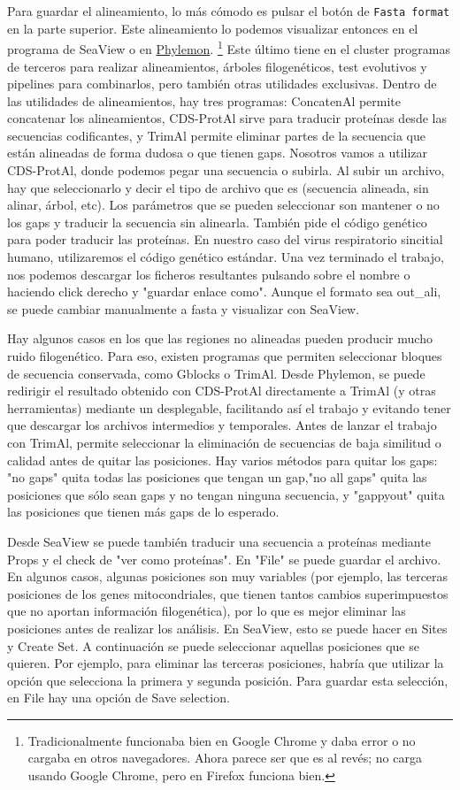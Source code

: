 Para guardar el alineamiento, lo más cómodo es pulsar el botón de \texttt{Fasta format} en la parte superior. Este alineamiento lo podemos visualizar entonces en el programa de SeaView o en \href{http://phylemon.bioinfo.cipf.es/}{Phylemon}. \footnote{Tradicionalmente funcionaba bien en Google Chrome y daba error o no cargaba en otros navegadores. Ahora parece ser que es al revés; no carga usando Google Chrome, pero en Firefox funciona bien.} Este último tiene en el cluster programas de terceros para realizar alineamientos, árboles filogenéticos, test evolutivos y pipelines para combinarlos, pero también otras utilidades exclusivas. Dentro de las utilidades de alineamientos, hay tres programas: ConcatenAl permite concatenar los alineamientos, CDS-ProtAl sirve para traducir proteínas desde las secuencias codificantes, y TrimAl permite eliminar partes de la secuencia que están alineadas de forma dudosa o que tienen gaps. Nosotros vamos a utilizar CDS-ProtAl, donde podemos pegar una secuencia o subirla. Al subir un archivo, hay que seleccionarlo y decir el tipo de archivo que es (secuencia alineada, sin alinar, árbol, etc). Los parámetros que se pueden seleccionar son mantener o no los gaps y traducir la secuencia sin alinearla. También pide el código genético para poder traducir las proteínas. En nuestro caso del virus respiratorio sincitial humano, utilizaremos el código genético estándar. Una vez terminado el trabajo, nos podemos descargar los ficheros resultantes pulsando sobre el nombre o haciendo click derecho y "guardar enlace como". Aunque el formato sea out\_ali, se puede cambiar manualmente a fasta y visualizar con SeaView. 

Hay algunos casos en los que las regiones no alineadas pueden producir mucho ruido filogenético. Para eso, existen programas que permiten seleccionar bloques de secuencia conservada, como Gblocks o TrimAl. Desde Phylemon, se puede redirigir el resultado obtenido con CDS-ProtAl directamente a TrimAl (y otras herramientas) mediante un desplegable, facilitando así el trabajo y evitando tener que descargar los archivos intermedios y temporales. Antes de lanzar el trabajo con TrimAl, permite seleccionar la eliminación de secuencias de baja similitud o calidad antes de quitar las posiciones. Hay varios métodos para quitar los gaps: "no gaps" quita todas las posiciones que tengan un gap,"no all gaps" quita las posiciones que sólo sean gaps y no tengan ninguna secuencia, y "gappyout" quita las posiciones que tienen más gaps de lo esperado. 

Desde SeaView se puede también traducir una secuencia a proteínas mediante Props y el check de "ver como proteínas". En "File" se puede guardar el archivo. En algunos casos, algunas posiciones son muy variables (por ejemplo, las terceras posiciones de los genes mitocondriales, que tienen tantos cambios superimpuestos que no aportan información filogenética), por lo que es mejor eliminar las posiciones antes de realizar los análisis. En SeaView, esto se puede hacer en Sites y Create Set. A continuación se puede seleccionar aquellas posiciones que se quieren. Por ejemplo, para eliminar las terceras posiciones, habría que utilizar la opción que selecciona la primera y segunda posición. Para guardar esta selección, en File hay una opción de Save selection.